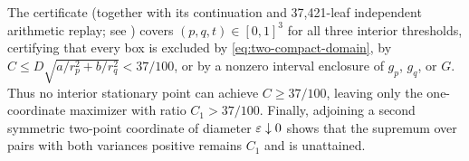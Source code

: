 The certificate 
(together with its continuation and 37,421-leaf independent arithmetic replay;
see ) covers $(p,q,t)\in[0,1]^3$ for
all three interior thresholds, certifying that every box is excluded by
\eqref{eq:two-compact-domain}, by $C\le D\sqrt{a/r_p^2+b/r_q^2}<37/100$, or
by a nonzero interval enclosure of $g_p$, $g_q$, or $G$. Thus no interior
stationary point can achieve $C\ge37/100$, leaving only the one-coordinate
maximizer with ratio $C_1>37/100$. Finally, adjoining a second symmetric
two-point coordinate of diameter $\varepsilon\downarrow0$ shows that the supremum
over pairs with both variances positive remains $C_1$ and is unattained.
